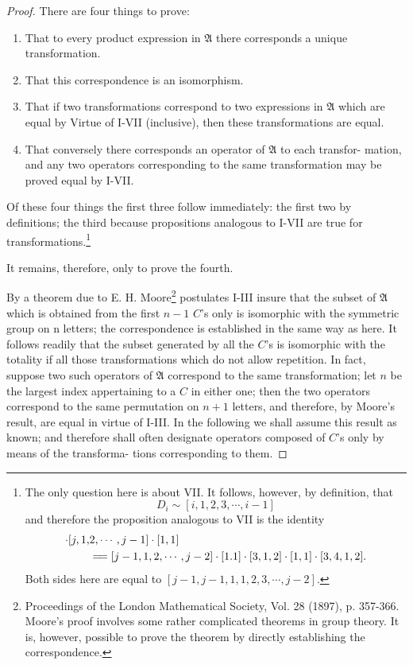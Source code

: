 \documentclass[9pt, twoside]{extarticle}
\newcommand{\td}[2][] {\todo[tickmarkheight=3pt, inline, size=\tiny, #1]{#2}}
\newcommand\longeq{=\joinrel=}
\begin{document}
\begin{proof}
  \td{newline after proof}
  There are four things to prove:
  \begin{enumerate}[label=\arabic*)]
  \item That to every product expression in \(\mathfrak{A}\) there corresponds a unique
    transformation.
  \item That this correspondence is an isomorphism.
  \item That if two transformations correspond to two expressions in \(\mathfrak{A}\) which
    are equal by Virtue of I-VII (inclusive), then these transformations are equal.
  \item That conversely there corresponds an operator of \(\mathfrak{A}\) to each transfor-
    mation, and any two operators corresponding to the same transformation may
    be proved equal by I-VII.
  \end{enumerate}

  Of these four things the first three follow immediately: the first two
  by definitions; the third because propositions analogous to I-VII are true
  \setcounter{footnote}{1} %
  for transformations.\footnote{The only question here is about VII. It follows, however, by definition, that
    \[D_i \sim [i, 1, 2, 3, \cdots, i-1]\]
    and therefore the proposition analogous to VII is the identity
    \begin{align*}
      [1, 1] \cdot [j, 1, &2, \cdots, j-1] \cdot [1,1] \\
      &\longeq [j-1, 1, 2, \cdots, j-2] \cdot [1. 1] \cdot [3, 1, 2] \cdot [1, 1] \cdot [3, 4, 1, 2].
    \end{align*}
    Both sides here are equal to \([j-1, j-1, 1, 1, 2, 3, \cdots, j-2].\)
  }

  \noindent It remains, therefore, only to prove the fourth.

  By a theorem due to E. H. Moore\footnote{Proceedings of the London Mathematical Society, Vol. 28 (1897), p. 357-366. Moore's proof involves some rather complicated theorems in group theory. It is, however, possible to prove the theorem by directly establishing the correspondence.} postulates I-III insure that the
  subset of \(\mathfrak{A}\) which is obtained from the first \(n-1\) \(C\)'s only is isomorphic
  with the symmetric group on n letters; the correspondence is established in
the same way as here. It follows readily that the subset generated by all the
\(C\)'s is isomorphic with the totality if all those transformations which do
not allow repetition. In fact, suppose two such operators of \(\mathfrak{A}\) correspond
to the same transformation; let \(n\) be the largest index appertaining to a \(C\)
in either one; then the two operators correspond to the same permutation on
\(n + 1\) letters, and therefore, by Moore's result, are equal in virtue of I-III.
In the following we shall assume this result as known; and therefore shall
often designate operators composed of \(C\)'s only by means of the transforma-
tions corresponding to them.


\end{proof}
\end{document}
